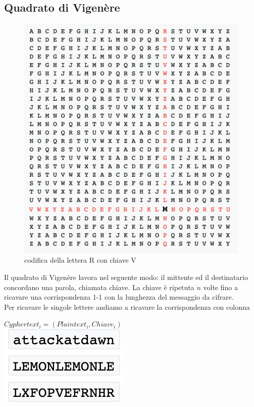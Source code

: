 \documentclass[11pt, oneside]{article}   	%
\begin{document}
\subsection*{Quadrato di Vigenère}
\begin{figure} [H]
\begin{center}
\includegraphics[scale=0.4]{vig}
\caption{codifica della lettera R con chiave V}
\end{center}
\end{figure}
Il quadrato di Vigenère lavora nel seguente modo: il mittente ed il destinatario concordano una parola, chiamata chiave. 
La chiave è ripetuta $n$ volte fino a ricavare una corrispondenza 1-1 con la lunghezza del messaggio da cifrare. \\
Per ricavare le singole lettere andiamo a ricavare la corrispondenza con colonna \begin{center}
\(Cyphertext_i = (Plaintext_i, Chiave_i)\)\\
\includegraphics[scale=0.7]{chiave}
\end{center}
\end{document}
